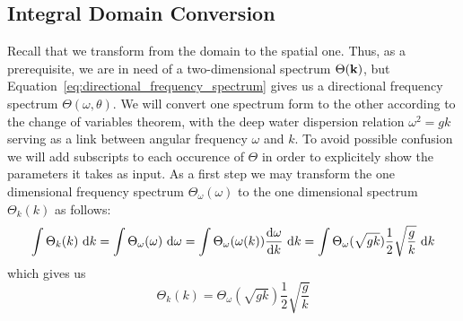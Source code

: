 \subsection{Integral Domain Conversion}
%
Recall that we transform from the  \wavenumber domain to the spatial 
one. Thus, as a prerequisite, we are in need of a two-dimensional \wavenumber 
spectrum $\Theta(\mathbf{k})$, but 
Equation~\ref{eq:directional_frequency_spectrum} 
gives us a directional frequency spectrum $\Theta(\omega,\theta)$. We will 
convert one spectrum form to the other according to the change of variables
theorem, with the deep water dispersion relation $\omega^2=gk$
serving as a link between angular frequency $\omega$ and \wavenumber $k$. To 
avoid possible confusion we will add subscripts to each occurence of $\Theta$ 
in order to explicitely show the parameters it takes as input.
As a first step we may transform the one dimensional frequency spectrum 
$\Theta_{\omega}(\omega)$ to the one dimensional \wavenumber 
spectrum $\Theta_k(k)$ as follows:
\begin{equation*}
 \int\Theta_k(k)~\mathrm{d}k = \int\Theta_{\omega}(\omega)~\mathrm{d}\omega\\ = 
\int\Theta_{\omega}(\omega(k))\frac{\mathrm{d}\omega}{\mathrm{d}k}~\mathrm{d}k
= \int\Theta_{\omega}(\sqrt{gk})\frac{1}{2}\sqrt{\frac{g}{k}}~\mathrm{d}k
\end{equation*}
which gives us
\begin{equation}
\label{eq:theta_k}
 \Theta_k(k) = \Theta_{\omega}(\sqrt{gk})\frac{1}{2}\sqrt{\frac{g}{k}}
\end{equation}

